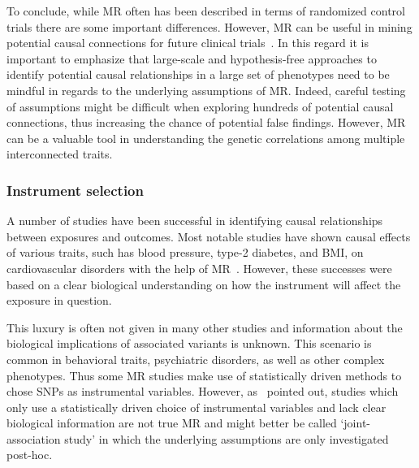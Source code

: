 To conclude, while MR often has been described in terms of randomized control trials there are some important differences.
However, MR can be useful in mining potential causal connections for future clinical trials~\cite{Evans2015}. 
In this regard it is important to emphasize that large-scale and hypothesis-free approaches to identify potential causal relationships in a large set of phenotypes need to be mindful in regards to the underlying assumptions of MR\@.
Indeed, careful testing of assumptions might be difficult when exploring hundreds of potential causal connections,
thus increasing the chance of potential false findings.
However, MR can be a valuable tool in understanding the genetic correlations among multiple interconnected traits. 

\subsubsection{Instrument selection}
\label{ssub:instrument_selection}

A number of studies have been successful in identifying causal relationships between exposures and outcomes.
Most notable studies have shown causal effects of various traits, such has blood pressure, type-2 diabetes, and BMI, on cardiovascular disorders with the help of MR~\cite{Swerdlow,Ference2015,Lieb2013,Voight2012a}.
However, these successes were based on a clear biological understanding on how the instrument will affect the exposure in question.

This luxury is often not given in many other studies and information about the biological implications of associated variants is unknown.
This scenario is common in behavioral traits, psychiatric disorders, as well as other complex phenotypes.
Thus some MR studies make use of statistically driven methods to chose SNPs as instrumental variables.
However, as~\citet{Burgess2016a} pointed out, studies which only use a statistically driven choice of instrumental variables and lack clear biological information are not true MR and might better be called `joint-association study' in which the underlying assumptions are only investigated post-hoc.

